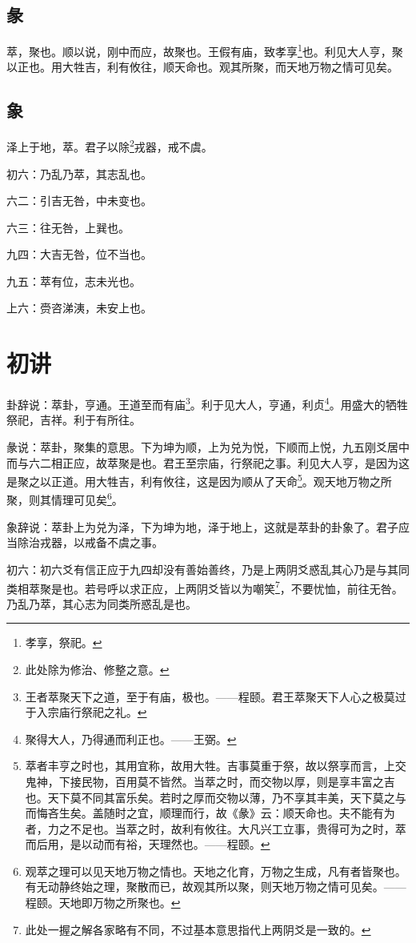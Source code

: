 \documentclass[12pt,oneside]{book}
\begin{document}
\subsection{彖}
萃，聚也。顺以说，刚中而应，故聚也。王假有庙，致孝享\footnote{孝享，祭祀。}也。利见大人亨，聚以正也。用大牲吉，利有攸往，顺天命也。观其所聚，而天地万物之情可见矣。

\subsection{象}
泽上于地，萃。君子以除\footnote{此处除为修治、修整之意。}戎器，戒不虞。

初六：乃乱乃萃，其志乱也。

六二：引吉无咎，中未变也。

六三：往无咎，上巽也。

九四：大吉无咎，位不当也。

九五：萃有位，志未光也。

上六：赍咨涕洟，未安上也。

\section{初讲}
卦辞说：萃卦，亨通。王道至而有庙\footnote{王者萃聚天下之道，至于有庙，极也。——程颐。君王萃聚天下人心之极莫过于入宗庙行祭祀之礼。}。利于见大人，亨通，利贞\footnote{聚得大人，乃得通而利正也。——王弼。}。用盛大的牺牲祭祀，吉祥。利于有所往。

彖说：萃卦，聚集的意思。下为坤为顺，上为兑为悦，下顺而上悦，九五刚爻居中而与六二相正应，故萃聚是也。君王至宗庙，行祭祀之事。利见大人亨，是因为这是聚之以正道。用大牲吉，利有攸往，这是因为顺从了天命\footnote{萃者丰亨之时也，其用宜称，故用大牲。吉事莫重于祭，故以祭享而言，上交鬼神，下接民物，百用莫不皆然。当萃之时，而交物以厚，则是享丰富之吉也。天下莫不同其富乐矣。若时之厚而交物以薄，乃不享其丰美，天下莫之与而悔吝生矣。盖随时之宜，顺理而行，故《彖》云：顺天命也。夫不能有为者，力之不足也。当萃之时，故利有攸往。大凡兴工立事，贵得可为之时，萃而后用，是以动而有裕，天理然也。——程颐。}。观天地万物之所聚，则其情理可见矣\footnote{观萃之理可以见天地万物之情也。天地之化育，万物之生成，凡有者皆聚也。有无动静终始之理，聚散而已，故观其所以聚，则天地万物之情可见矣。——程颐。天地即万物之所聚也。}。

象辞说：萃卦上为兑为泽，下为坤为地，泽于地上，这就是萃卦的卦象了。君子应当除治戎器，以戒备不虞之事。

初六：初六爻有信正应于九四却没有善始善终，乃是上两阴爻惑乱其心乃是与其同类相萃聚是也。若号呼以求正应，上两阴爻皆以为嘲笑\footnote{此处一握之解各家略有不同，不过基本意思指代上两阴爻是一致的。}，不要忧恤，前往无咎。乃乱乃萃，其心志为同类所惑乱是也。
\end{document}
